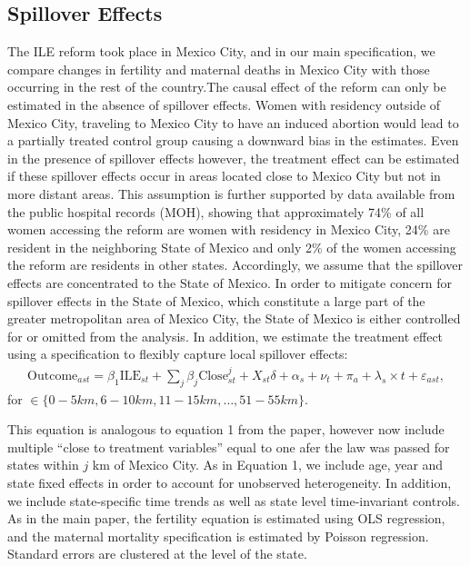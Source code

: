 \documentclass[a4paper, 11pt]{article}
\begin{document}
\begin{spacing}{1.4}
\subsection{Spillover Effects}\label{Spillover}
The ILE reform took place in Mexico City, and in our main specification, we compare changes
in fertility and maternal deaths in Mexico City with those occurring in the rest of the
country.The causal effect of the reform can only be estimated in the absence of spillover
effects. Women with residency outside of Mexico City, traveling to Mexico City to have an
induced abortion would lead to a partially treated control group causing a downward bias in
the estimates.  Even in the presence of spillover effects however, the treatment effect can
be estimated if these spillover effects occur in areas located close to Mexico City but not
in more distant areas. This assumption is further supported by data available from the
public hospital records (MOH), showing that approximately 74\% of all women accessing the
reform are women with residency in Mexico City, 24\% are resident in the neighboring State
of Mexico and only 2\% of the women accessing the reform are residents in other states.
Accordingly, we assume that the spillover effects are concentrated to the State of Mexico.
In order to mitigate concern for spillover effects in the State of Mexico, which constitute
a large part of the greater metropolitan area of Mexico City, the State of Mexico is either
controlled for or omitted from the analysis. In addition, we estimate the treatment effect
using a specification to flexibly capture local spillover effects:
\begin{eqnarray}\label{eq3}
  \text{Outcome}_{ast}= \beta_{1} \text{ILE}_{st} + \sum_{j}\beta_{j}\text{Close}^j_{st} +
  X_{st}\delta +\alpha_{s} + \nu_{t} +\pi_{a}+ \lambda_{s}\times t +\varepsilon_{ast},
\end{eqnarray}
for $ \in \{0-5km, 6-10km, 11-15km, \ldots, 51-55km\}$.

This equation is analogous to equation 1 from the paper, however now include multiple
``close to treatment variables'' equal to one afer the law was passed for states within
$j$ km of Mexico City. As in Equation 1, we include age, year and state fixed effects in
order to account for unobserved heterogeneity. In addition, we include state-specific
time trends as well as state level time-invariant controls. As in the main paper, the
fertility equation is estimated using OLS regression, and the maternal mortality
specification is estimated by Poisson regression.  Standard errors are clustered at the
level of the state.


\end{spacing}
\end{document}

